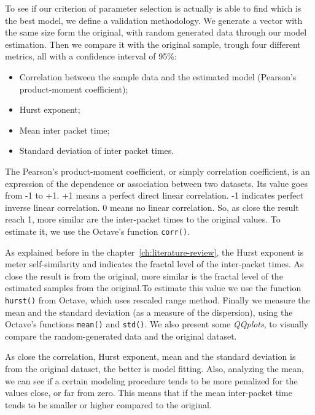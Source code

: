 To see if our criterion of parameter selection is actually is able to find which is the best model, we define a validation methodology. 
We generate a vector with the same size form the original, with random generated data through our model estimation. Then we compare it with the original sample, trough four different metrics, all with a confidence interval of 95\%:

\begin{itemize}
\item Correlation between the sample data and the estimated model (Pearson's product-moment coefficient);
\item Hurst exponent;
\item Mean inter packet time;
\item Standard deviation of inter packet times.
\end{itemize}

The Pearson's product-moment coefficient, or simply correlation coefficient,  is an expression of the dependence or association between two datasets. Its value goes from -1 to +1. +1 means a perfect direct linear correlation. -1 indicates perfect inverse linear correlation. 0 means no linear correlation. So, as close the result reach 1, more similar are the inter-packet times to the original values. To estimate it, we use the Octave's function \texttt{corr()}.

As explained before in the chapter~\ref{ch:literature-review}, the Hurst exponent is meter self-similarity and indicates the fractal level of the inter-packet times. As close the result is from the original, more similar is the fractal level of the estimated samples from the original.To estimate this value we use the function \texttt{hurst()} from Octave, which uses rescaled range method.
Finally we measure the mean and the standard deviation (as a measure of the dispersion), using the Octave's functions \texttt{mean()} and \texttt{std()}. We also present some \textit{QQplots}, to visually compare the random-generated data and the original dataset. 

As close the correlation, Hurst exponent, mean and the standard deviation is from the original dataset, the better is model fitting. Also, analyzing the mean, we can see if a certain modeling procedure tends to be more penalized for the values close, or far from zero. This means that if the mean inter-packet time tends to be smaller or higher compared to the original. 

